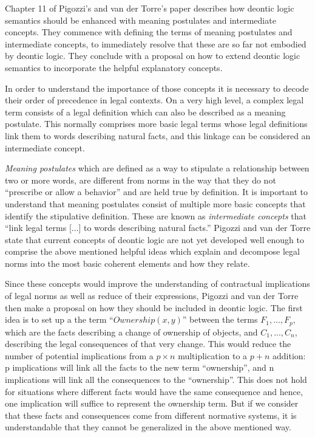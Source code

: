 \documentclass[12pt]{article}
\begin{document}
\maketitle

Chapter 11 of Pigozzi’s and van der Torre’s paper \cite{pigozzi2017multiagent} describes how deontic logic semantics should be enhanced with meaning postulates and intermediate concepts. They commence with defining the terms of meaning postulates and intermediate concepts, to immediately resolve that these are so far not embodied by deontic logic. They conclude with a proposal on how to extend deontic logic semantics to incorporate the helpful explanatory concepts.

In order to understand the importance of those concepts it is necessary to decode their order of precedence in legal contexts. On a very high level, a complex legal term consists of a legal definition which can also be described as a meaning postulate. This normally comprises more basic legal terms whose legal definitions link them to words describing natural facts, and this linkage can be considered an intermediate concept.

\emph{Meaning postulates} which are defined as a way to stipulate a relationship between two or more words, are different from norms in the way that they do not \enquote{prescribe or allow a behavior} and are held true by definition. It is important to understand that meaning postulates consist of multiple more basic concepts that identify the stipulative definition. These are known as \emph{intermediate concepts} that \enquote{link legal terms [...] to words describing natural facts.}
Pigozzi and van der Torre state that current concepts of deontic logic are not yet developed well enough to comprise the above mentioned helpful ideas which explain and decompose legal norms into the most basic coherent elements and how they relate.

Since these concepts would improve the understanding of contractual implications of legal norms as well as reduce of their expressions, Pigozzi and van der Torre then make a proposal on how they should be included in deontic logic. 
The first idea is to set up a the term \enquote{$\mathit{Ownership}(x,y)$} between the terms $F_1,...,F_p$, which are the facts describing a change of ownership of objects,  and $C_1,...,C_n$, describing the legal consequences of that very change. This would reduce the number of potential implications from a $p \times n$ multiplication to a $p + n$ addition: p implications will link all the facts to the new term \enquote{ownership}, and n implications will link all the consequences to the \enquote{ownership}. This does not hold for situations where different facts would have the same consequence and hence, one implication will suffice to represent the ownership term. But if we consider that these facts and consequences come from different normative systems, it is understandable that they cannot be generalized in the above mentioned way.
\end{document}
